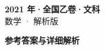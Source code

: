 \documentclass[zihao=-4, a4paper]{ctexart}
\begin{document}
\begin{center}
  {\Large\bfseries 2021 年·全国乙卷·文科}\\[4pt]
  {\large 数学 · 解析版}
\end{center}
\medskip
{}

\clearpage
{}
\begin{center}{\Large\bfseries 参考答案与详细解析}\end{center}
\medskip

\end{document}
